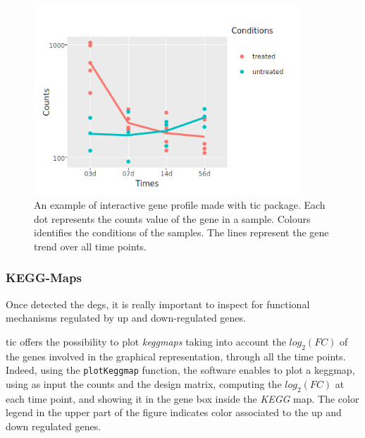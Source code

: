 \begin{figure}[H]
\centering
\includegraphics[width=10cm, keepaspectratio]{img/ticorser/gene_trend.png}
\caption[\gls{tic} gene profile]{An example of interactive gene profile made with \gls{tic} package. Each dot represents the counts value of the gene in a sample. Colours identifies the conditions of the samples. The lines represent the gene trend over all time points.}
\label{fig:ticorsergenetrend}
\end{figure}


\subsubsection{KEGG-Maps}
Once detected the \glspl{deg}, it is really important to inspect for functional mechanisms regulated by up and down-regulated genes. 

\Gls{tic} offers the possibility to plot \textit{keggmaps} \cite{Kanehisa2016} taking into account the $log_2(FC)$ of the genes involved in the graphical representation, through all the time points.
Indeed, using the \lstinline!plotKeggmap! function, the software enables to plot a keggmap, using as input the counts and the design matrix, computing the $log_2(FC)$ at each time point, and showing it in the gene box inside the \textit{KEGG} map.
The color legend in the upper part of the figure indicates color associated to the up and down regulated genes.

